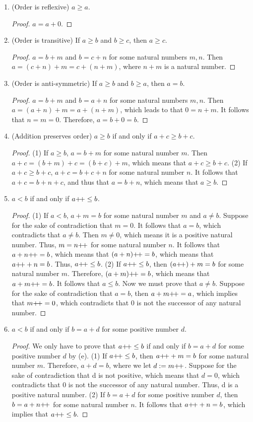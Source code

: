 \begin{enumerate}
    \item (Order is reflexive) $a \geq a$.
\begin{proof}
    $a=a+0$.
\end{proof}
    \item (Order is transitive) If $a\geq b$ and $b\geq c$, then $a \geq c$.
\begin{proof}
    $a=b+m$ and $b=c+n$ for some natural numbers $m,n$. Then $a=(c+n)+m=c+(n+m)$, where $n+m$ is a natural number.
\end{proof}
    \item (Order is anti-symmetric) If $a \geq b$ and $b \geq a$, then $a = b$.
\begin{proof}
    $a=b+m$ and $b=a+n$ for some natural numbers $m,n$. Then $a=(a+n)+m=a+(n+m)$, which leads to that $0=n+m$. It follows that $n=m=0$. Therefore, $a=b+0=b$.
\end{proof}
    \item (Addition preserves order) $a\geq b$ if and only if $a+c\geq b+c$.
\begin{proof}
    (1) If $a\geq b$, $a=b+m$ for some natural number $m$. Then $a+c=(b+m)+c=(b+c)+m$, which means that $a+c\geq b+c$. (2) If $a+c\geq b+c$, $a+c = b+c + n$ for some natural number $n$. It follows that $a+c=b+n+c$, and thus that $a=b+n$, which means that $a\geq b$.
\end{proof}
    \item $a<b$ if and only if $a{+}{\mkern-3mu}{+} \leq b$.
\begin{proof}
    (1) If $a<b$, $a+m=b$ for some natural number $m$ and $a\neq b$. Suppose for the sake of contradiction that $m=0$. It follows that $a=b$, which contradicts that $a\neq b$. Then $m\neq 0$, which means it is a positive natural number. Thus, $m=n{+}{\mkern-3mu}{+}$ for some natural number $n$. It follows that $a+n{+}{\mkern-3mu}{+}=b$, which means that $(a+n){+}{\mkern-3mu}{+}=b$, which means that $a{+}{\mkern-3mu}{+} + n = b$. Thus, $a{+}{\mkern-3mu}{+} \leq b$.
    (2) If $a{+}{\mkern-3mu}{+} \leq b$, then $(a{+}{\mkern-3mu}{+})+m=b$ for some natural number $m$. Therefore, $(a+m){+}{\mkern-3mu}{+}=b$, which means that $a+m{+}{\mkern-3mu}{+}=b$. It follows that $a\leq b$. Now we must prove that $a \neq b$. Suppose for the sake of contradiction that $a=b$, then $a+m{+}{\mkern-3mu}{+}=a$, which implies that $m{+}{\mkern-3mu}{+}=0$, which contradicts that $0$ is not the successor of any natural number.
\end{proof}
    \item $a<b$ if and only if $b=a+d$ for some positive number $d$.
\begin{proof}
    We only have to prove that $a{+}{\mkern-3mu}{+} \leq b$ if and only if $b=a+d$ for some positive number $d$ by (e).
    (1) If $a{+}{\mkern-3mu}{+} \leq b$, then $a{+}{\mkern-3mu}{+} + m = b$ for some natural number $m$. Therefore, $a + d = b$, where we let $d:=m{+}{\mkern-3mu}{+}$. Suppose for the sake of contradiction that d is not positive, which means that $d=0$, which contradicts that $0$ is not the successor of any natural number. Thus, d is a positive natural number.
    (2) If $b=a+d$ for some positive number $d$, then $b=a+n{+}{\mkern-3mu}{+}$ for some natural number $n$. It follows that $a{+}{\mkern-3mu}{+} + n =b$, which implies that $a{+}{\mkern-3mu}{+} \leq b$.
\end{proof}
\end{enumerate}

